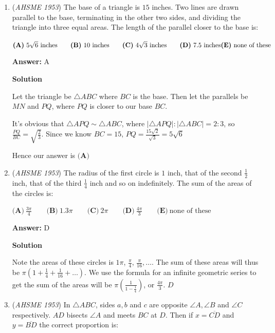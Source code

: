 \begin{enumerate}
 


	\item (\textit{AHSME 1953}) The base of a triangle is $15$ inches. Two lines are drawn parallel to the base, terminating in the other two sides, and dividing the triangle into three equal areas. The length of the parallel closer to the base is: 


 $\textbf{(A)}\ 5\sqrt{6}\text{ inches} \qquad \textbf{(B)}\ 10\text{ inches} \qquad \textbf{(C)}\ 4\sqrt{3}\text{ inches}\qquad \textbf{(D)}\ 7.5\text{ inches}\\  \textbf{(E)}\ \text{none of these}$

 \textbf{Answer: }A



\textbf{Solution}

Let the triangle be $\triangle ABC$ where $BC$ is the base. Then let the parallels be $MN$ and $PQ$, where $PQ$ is closer to our base $BC$. 

 It's obvious that $\triangle APQ \sim \triangle ABC$, where $|\triangle APQ|:|\triangle ABC|=2:3$, so $\frac{PQ}{BC}=\sqrt{\frac{2}{3}}$. Since we know $BC=15$, $PQ=\frac{15\sqrt{2}}{\sqrt{3}}=5\sqrt{6}$

 Hence our answer is $\textbf{(A)}$



	\item (\textit{AHSME 1953}) The radius of the first circle is $1$ inch, that of the second $\frac{1}{2}$ inch, that of the third $\frac{1}{4}$ inch and so on indefinitely. 
The sum of the areas of the circles is: 


 $\textbf{(A)}\ \frac{3\pi}{4} \qquad \textbf{(B)}\ 1.3\pi \qquad \textbf{(C)}\ 2\pi \qquad \textbf{(D)}\ \frac{4\pi}{3}\qquad \textbf{(E)}\ \text{none of these}$

 \textbf{Answer: }D



\textbf{Solution}

Note the areas of these circles is $1\pi$, $\frac{\pi}{4}$, $\frac{\pi}{16}, \dots$. The sum of these areas will thus be $\pi\left(1+\frac{1}{4}+\frac{1}{16}+\dots\right)$. We use the formula for an infinite geometric series to get the sum of the areas will be $\pi\left(\frac{1}{1-\frac{1}{4}}\right)$, or $\frac{4\pi}{3}$.  $\boxed{D}$



	\item (\textit{AHSME 1953}) In $\triangle ABC$, sides $a,b$ and $c$ are opposite $\angle{A},\angle{B}$ and $\angle{C}$ respectively. $AD$ bisects $\angle{A}$ and meets $BC$ at $D$. 
Then if $x = \overline{CD}$ and $y = \overline{BD}$ the correct proportion is: 



\end{enumerate}
